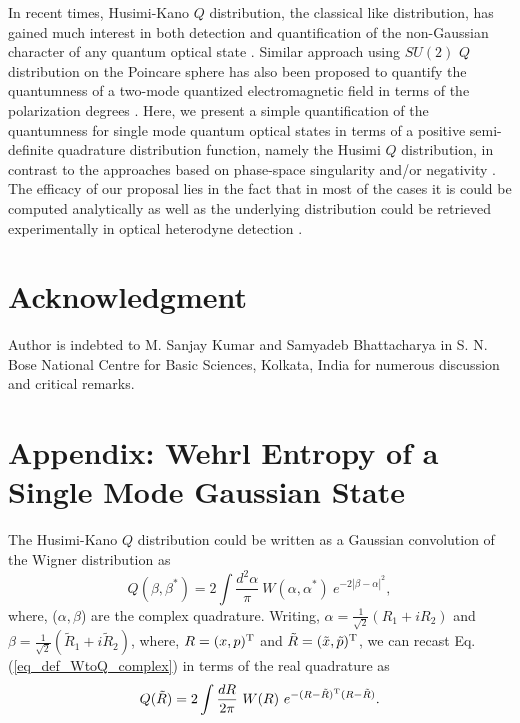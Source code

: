 \documentclass[letter,scriptaddress,twocolumn,prl,showkeys]{revtex4}
\begin{document}
In recent times, Husimi-Kano $Q$ distribution, the classical like distribution, has gained much interest in both detection and quantification of the non-Gaussian character of any quantum optical state \cite{ngm_we_ivan, ngd_qdist_hughes}. 
Similar approach using $SU(2)$ $Q$ distribution on the Poincare sphere has also been proposed to quantify the quantumness of a two-mode quantized electromagnetic field in terms of the polarization degrees \cite{su2_qdist_luis, su2_qdist_nc_luis}.
Here, we present a simple quantification of the quantumness for single mode quantum optical states in terms of a positive semi-definite quadrature distribution function, namely the Husimi $Q$ distribution, in contrast to the approaches based on phase-space singularity and/or negativity \cite{ncm_depth_lee, ncm_depth_crit_barnett, ncm_nwf_kenfack, ncm_kiesel, ncm_agudelo}.   
The efficacy of our proposal lies in the fact that in most of the cases it is could be computed analytically as well as the underlying distribution could be retrieved experimentally in optical heterodyne detection \cite{heterodyne_kimble}.

\section*{Acknowledgment}

Author is indebted to M. Sanjay Kumar and Samyadeb Bhattacharya in S. N. Bose National Centre for Basic Sciences, Kolkata, India for numerous discussion and critical remarks.

\section*{Appendix: Wehrl Entropy of a Single Mode Gaussian State}

The Husimi-Kano $Q$ distribution could be written as a Gaussian convolution of the Wigner distribution as
\begin{equation}
Q(\beta,\beta^{*}) = 2 \int \frac{d^{2}\alpha}{\pi}~ W(\alpha,\alpha^{*})~ e^{-2|\beta - \alpha|^{2}},
\label{eq_def_WtoQ_complex}
\end{equation}
where, ($\alpha,\beta$) are the complex quadrature.
Writing, $\alpha = \frac{1}{\sqrt{2}} (R_{1} + iR_{2})$ and $\beta = \frac{1}{\sqrt{2}} (\tilde{R}_{1} + i\tilde{R}_{2})$, where, $R = (x,p)^{\rm{T}}$ and $\tilde{R} = (\tilde{x},\tilde{p})^{\rm{T}}$, we can recast Eq. (\ref{eq_def_WtoQ_complex}) in terms of the real quadrature as
\begin{equation}
Q(\tilde{R}) = 2 \int \frac{dR}{2\pi}~ W(R)~ e^{-(R-\tilde{R})^{\rm{T}}(R-\tilde{R})}.
\label{eq_def_WtoQ_real}
\end{equation}
\end{document}
